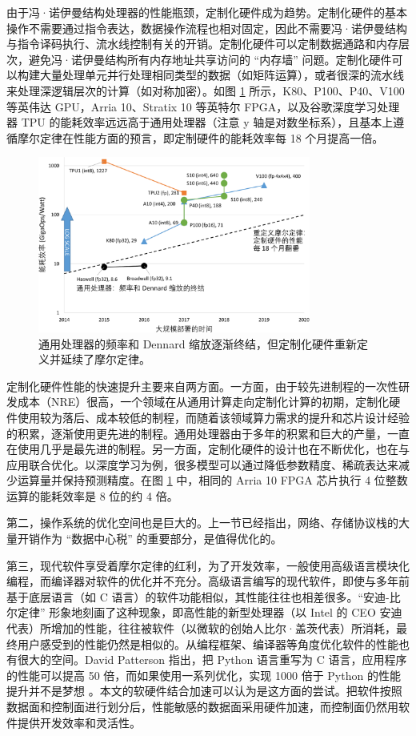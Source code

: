 由于冯·诺伊曼结构处理器的性能瓶颈，定制化硬件成为趋势。定制化硬件的基本操作不需要通过指令表达，数据操作流程也相对固定，因此不需要冯·诺伊曼结构与指令译码执行、流水线控制有关的开销。定制化硬件可以定制数据通路和内存层次，避免冯·诺伊曼结构所有内存地址共享访问的 ``内存墙'' 问题。定制化硬件可以构建大量处理单元并行处理相同类型的数据（如矩阵运算），或者很深的流水线来处理深逻辑层次的计算（如对称加密）。如图 \ref{background:fig:moores_law_redefined} 所示，K80、P100、P40、V100 等英伟达 GPU，Arria 10、Stratix 10 等英特尔 FPGA，以及谷歌深度学习处理器 TPU 的能耗效率远远高于通用处理器（注意 y 轴是对数坐标系），且基本上遵循摩尔定律在性能方面的预言，即定制硬件的能耗效率每 18 个月提高一倍。

\begin{figure}[htbp]
	\centering
	\includegraphics[width=0.8\textwidth]{figures/moores_law_redefined.pdf}
	\caption{通用处理器的频率和 Dennard 缩放逐渐终结，但定制化硬件重新定义并延续了摩尔定律。}
	\label{background:fig:moores_law_redefined}
\end{figure}


定制化硬件性能的快速提升主要来自两方面。一方面，由于较先进制程的一次性研发成本（NRE）很高，一个领域在从通用计算走向定制化计算的初期，定制化硬件使用较为落后、成本较低的制程，而随着该领域算力需求的提升和芯片设计经验的积累，逐渐使用更先进的制程。通用处理器由于多年的积累和巨大的产量，一直在使用几乎是最先进的制程。另一方面，定制化硬件的设计也在不断优化，也在与应用联合优化。以深度学习为例，很多模型可以通过降低参数精度、稀疏表达来减少运算量并保持预测精度。在图 \ref{background:fig:moores_law_redefined} 中，相同的 Arria 10 FPGA 芯片执行 4 位整数运算的能耗效率是 8 位的约 4 倍。


第二，操作系统的优化空间也是巨大的。上一节已经指出，网络、存储协议栈的大量开销作为 ``数据中心税'' 的重要部分，是值得优化的。

第三，现代软件享受着摩尔定律的红利，为了开发效率，一般使用高级语言模块化编程，而编译器对软件的优化并不充分。高级语言编写的现代软件，即使与多年前基于底层语言（如 C 语言）的软件功能相似，其性能往往也相差很多。``安迪-比尔定律'' \cite{langchaozhidian} 形象地刻画了这种现象，即高性能的新型处理器（以 Intel 的 CEO 安迪代表）所增加的性能，往往被软件（以微软的创始人比尔·盖茨代表）所消耗，最终用户感受到的性能仍然是相似的。从编程框架、编译器等角度优化软件的性能也有很大的空间。David Patterson 指出，把 Python 语言重写为 C 语言，应用程序的性能可以提高 50 倍，而如果使用一系列优化，实现 1000 倍于 Python 的性能提升并不是梦想 \cite{python-to-c}。本文的软硬件结合加速可以认为是这方面的尝试。把软件按照数据面和控制面进行划分后，性能敏感的数据面采用硬件加速，而控制面仍然用软件提供开发效率和灵活性。

